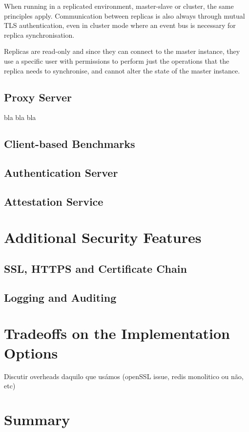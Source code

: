 When running in a replicated environment, master-slave or cluster, the same principles apply. Communication between replicas is also always through mutual \gls{TLS} authentication, even in cluster mode where an event bus is necessary for replica synchronisation. 

Replicas are read-only and since they can connect to the master instance, they use a specific user with permissions to perform just the operations that the replica needs to synchronise, and cannot alter the state of the master instance.

\subsection{Proxy Server}
\label{ssec:proxy_server}

bla bla bla

\subsection{Client-based Benchmarks}
\label{ssec:client_based_benchmarks}

\subsection{Authentication Server}
\label{ssec:implementation_authentication_server}

\subsection{Attestation Service}
\label{ssec:attestation_service}

\section{Additional Security Features}
\label{sec:additional_security_features}

\subsection{SSL, HTTPS and Certificate Chain}
\label{ssec:ssl_https_certificate_chain}

\subsection{Logging and Auditing} 
\label{sec:logging_and_auditing}

\section{Tradeoffs on the Implementation Options}
\label{sec:tradeoffs_implementation_options}

Discutir overheads daquilo que usámos (openSSL issue, redis monolitico ou não, etc)

\section{Summary}
\label{sec:chapter4_summary}